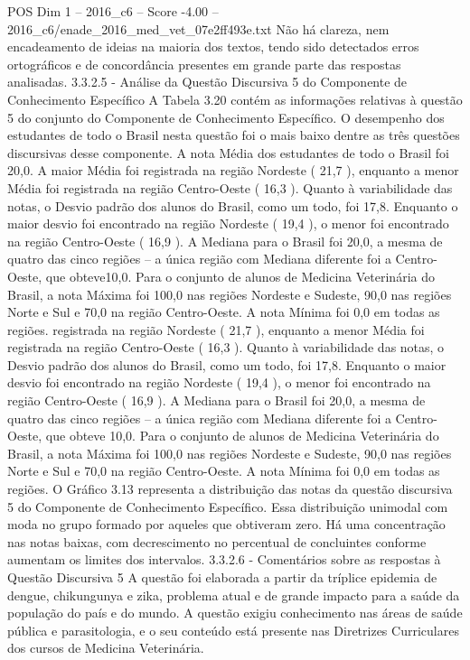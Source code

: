 \begin{textsample}{POS Dim 1 – 2016\_c6 – Score -4.00 – 2016\_c6/enade\_2016\_med\_vet\_07e2ff493e.txt}
Não há clareza, nem encadeamento de ideias na maioria dos textos, tendo sido detectados erros ortográficos e de concordância presentes em grande parte das respostas analisadas. 3.3.2.5 - Análise da Questão Discursiva 5 do Componente de Conhecimento Específico A Tabela 3.20 contém as informações relativas à questão 5 do conjunto do Componente de Conhecimento Específico.
O desempenho dos estudantes de todo o Brasil nesta questão foi o mais baixo dentre as três questões discursivas desse componente.
A nota Média dos estudantes de todo o Brasil foi 20,0.
A maior Média foi registrada na região Nordeste ( 21,7 ), enquanto a menor Média foi registrada na região Centro-Oeste ( 16,3 ).
Quanto à variabilidade das notas, o Desvio padrão dos alunos do Brasil, como um todo, foi 17,8.
Enquanto o maior desvio foi encontrado na região Nordeste ( 19,4 ), o menor foi encontrado na região Centro-Oeste ( 16,9 ).
A Mediana para o Brasil foi 20,0, a mesma de quatro das cinco regiões – a única região com Mediana diferente foi a Centro-Oeste, que obteve10,0.
Para o conjunto de alunos de Medicina Veterinária do Brasil, a nota Máxima foi 100,0 nas regiões Nordeste e Sudeste, 90,0 nas regiões Norte e Sul e 70,0 na região Centro-Oeste.
A nota Mínima foi 0,0 em todas as regiões. registrada na região Nordeste ( 21,7 ), enquanto a menor Média foi registrada na região Centro-Oeste ( 16,3 ).
Quanto à variabilidade das notas, o Desvio padrão dos alunos do Brasil, como um todo, foi 17,8.
Enquanto o maior desvio foi encontrado na região Nordeste ( 19,4 ), o menor foi encontrado na região Centro-Oeste ( 16,9 ).
A Mediana para o Brasil foi 20,0, a mesma de quatro das cinco regiões – a única região com Mediana diferente foi a Centro-Oeste, que obteve 10,0.
Para o conjunto de alunos de Medicina Veterinária do Brasil, a nota Máxima foi 100,0 nas regiões Nordeste e Sudeste, 90,0 nas regiões Norte e Sul e 70,0 na região Centro-Oeste.
A nota Mínima foi 0,0 em todas as regiões.
O Gráfico 3.13 representa a distribuição das notas da questão discursiva 5 do Componente de Conhecimento Específico.
Essa distribuição unimodal com moda no grupo formado por aqueles que obtiveram zero.
Há uma concentração nas notas baixas, com decrescimento no percentual de concluintes conforme aumentam os limites dos intervalos. 3.3.2.6 - Comentários sobre as respostas à Questão Discursiva 5 A questão foi elaborada a partir da tríplice epidemia de dengue, chikungunya e zika, problema atual e de grande impacto para a saúde da população do país e do mundo.
A questão exigiu conhecimento nas áreas de saúde pública e parasitologia, e o seu conteúdo está presente nas Diretrizes Curriculares dos cursos de Medicina Veterinária.

\end{textsample}
